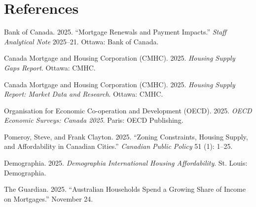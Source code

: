 \documentclass[11pt]{article}
\begin{document}
\newpage
\section*{References}

Bank of Canada. 2025. “Mortgage Renewals and Payment Impacts.” \textit{Staff Analytical Note} 2025--21. Ottawa: Bank of Canada.

Canada Mortgage and Housing Corporation (CMHC). 2025. \textit{Housing Supply Gaps Report}. Ottawa: CMHC.

Canada Mortgage and Housing Corporation (CMHC). 2025. \textit{Housing Supply Report: Market Data and Research}. Ottawa: CMHC.

Organisation for Economic Co-operation and Development (OECD). 2025. \textit{OECD Economic Surveys: Canada 2025}. Paris: OECD Publishing.

Pomeroy, Steve, and Frank Clayton. 2025. “Zoning Constraints, Housing Supply, and Affordability in Canadian Cities.” \textit{Canadian Public Policy} 51 (1): 1–25.

Demographia. 2025. \textit{Demographia International Housing Affordability}. St. Louis: Demographia.

The Guardian. 2025. “Australian Households Spend a Growing Share of Income on Mortgages.” November 24.
\end{document}
